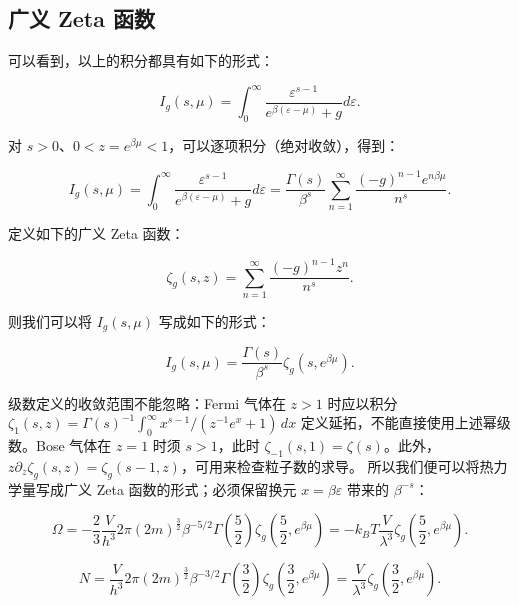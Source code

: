 \subsection{广义 Zeta 函数}
可以看到，以上的积分都具有如下的形式：
\begin{linenomath}\begin{equation}
    I_g(s,\mu)=\int_{0}^{\infty} \frac{\varepsilon^{s-1}}{e^{\beta(\varepsilon - \mu)} + g} d\varepsilon.
\end{equation}\end{linenomath}
对 $s>0$、$0<z=e^{\beta\mu}<1$，可以逐项积分（绝对收敛），得到：
\begin{linenomath}\begin{equation}
    I_g(s,\mu) = \int_{0}^{\infty} \frac{\varepsilon^{s-1}}{e^{\beta(\varepsilon - \mu)} + g} d\varepsilon = \frac{\Gamma(s)}{\beta^s} \sum_{n=1}^{\infty} \frac{(-g)^{n-1} e^{n\beta\mu}}{n^s}.
\end{equation}\end{linenomath}
定义如下的广义 Zeta 函数：
\begin{linenomath}\begin{equation}
    \zeta_g(s,z) = \sum_{n=1}^{\infty} \frac{(-g)^{n-1} z^n}{n^s}.
\end{equation}\end{linenomath}
则我们可以将 $I_g(s,\mu)$ 写成如下的形式：
\begin{linenomath}\begin{equation}
    I_g(s,\mu) = \frac{\Gamma(s)}{\beta^s} \zeta_g(s,e^{\beta\mu}).
\end{equation}\end{linenomath}
级数定义的收敛范围不能忽略：Fermi 气体在 $z>1$ 时应以积分 $\zeta_1(s,z)=\Gamma(s)^{-1}\int_0^\infty x^{s-1}/(z^{-1}e^x+1)\,dx$ 定义延拓，不能直接使用上述幂级数。Bose 气体在 $z=1$ 时须 $s>1$，此时 $\zeta_{-1}(s,1)=\zeta(s)$。此外，$z\partial_z\zeta_g(s,z)=\zeta_g(s-1,z)$，可用来检查粒子数的求导。
所以我们便可以将热力学量写成广义 Zeta 函数的形式；必须保留换元 $x=\beta\varepsilon$ 带来的 $\beta^{-s}$：
\begin{linenomath}
    \begin{equation}
        \Omega = - \frac{2}{3}\frac{V}{h^3} 2\pi (2m)^{\frac32} \beta^{-5/2}\Gamma\left( \frac{5}{2} \right) \zeta_g\left( \frac{5}{2}, e^{\beta\mu} \right) = - k_BT \frac{V}{\lambda^3}\zeta_g\left( \frac{5}{2}, e^{\beta\mu} \right).
    \end{equation}
\end{linenomath}
\begin{linenomath}\begin{equation}
    N = \frac{V}{h^3} 2\pi (2m)^{\frac32} \beta^{-3/2}\Gamma\left( \frac{3}{2} \right) \zeta_g\left( \frac{3}{2}, e^{\beta\mu} \right) = \frac{V}{\lambda^3} \zeta_g\left( \frac{3}{2}, e^{\beta\mu} \right).
\end{equation}\end{linenomath}

